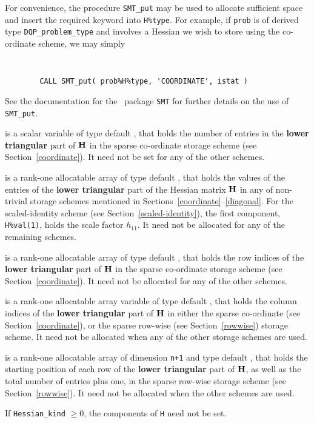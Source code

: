 \documentclass{galahad}
\newcommand{\packagename}{DQP}
\begin{document}
\begin{description}
\begin{description}
For convenience, the procedure {\tt SMT\_put}
may be used to allocate sufficient space and insert the required keyword
into {\tt H\%type}.
For example, if {\tt prob} is of derived type {\tt \packagename\_problem\_type}
and involves a Hessian we wish to store using the co-ordinate scheme,
we may simply
{\tt
\begin{verbatim}
        CALL SMT_put( prob%H%type, 'COORDINATE', istat )
\end{verbatim}
}
\noindent
See the documentation for the \galahad\ package {\tt SMT}
for further details on the use of {\tt SMT\_put}.

 is a scalar variable of type default \integer, that
holds the number of entries in the {\bf lower triangular} part of ${\mathbf{H}}$
in the sparse co-ordinate storage scheme (see Section~\ref{coordinate}).
It need not be set for any of the other schemes.

 is a rank-one allocatable array of type default \realdp, that holds
the values of the entries of the {\bf lower triangular} part
of the Hessian matrix ${\mathbf{H}}$ in any of non-trivial storage schemes
mentioned in Sections~\ref{coordinate}--\ref{diagonal}.
For the scaled-identity scheme (see Section~\ref{scaled-identity}),
the first component, {\tt H\%val(1)}, holds the scale factor $h_{11}$.
It need not be allocated for any of the remaining schemes.

 is a rank-one allocatable array of type default \integer,
that holds the row indices of the {\bf lower triangular} part of ${\mathbf{H}}$
in the sparse co-ordinate storage scheme (see Section~\ref{coordinate}).
It need not be allocated for any of the other schemes.

 is a rank-one allocatable array variable of type default \integer,
that holds the column indices of the {\bf lower triangular} part of
${\mathbf{H}}$ in either the sparse co-ordinate
(see Section~\ref{coordinate}), or the sparse row-wise
(see Section~\ref{rowwise}) storage scheme.
It need not be allocated when any of the other storage schemes are used.

 is a rank-one allocatable array of dimension {\tt n+1} and type
default \integer, that holds the starting position of
each row of the {\bf lower triangular} part of ${\mathbf{H}}$, as well
as the total number of entries plus one, in the sparse row-wise storage
scheme (see Section~\ref{rowwise}). It need not be allocated when the
other schemes are used.
\end{description}
If {\tt Hessian\_kind} $\geq 0$, the components of {\tt H} need not be set.


\end{description}
\end{document}
